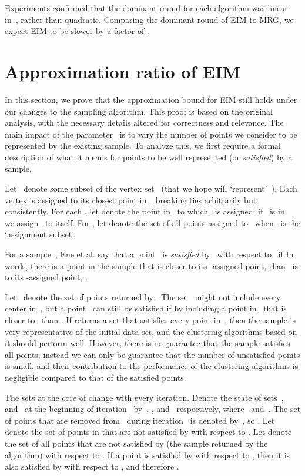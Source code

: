 \documentclass[11pt]{article}
\newcommand{\ours}{{\sc MRG}\xspace}
\newcommand{\ene}{{\sc EIM}\xspace}
\begin{document}
Experiments confirmed that
the dominant round for each algorithm was linear in~, rather
than quadratic.
Comparing the dominant round of \ene to \ours,
we expect  \ene to be slower by a factor of
. 





\section{Approximation ratio of \ene}
\label{sec:sampling}




In this section, we prove that the approximation bound for
\ene still holds under our changes to the sampling algorithm. 
This proof is based on the original analysis,
with the necessary details altered for correctness and relevance.
The main impact of the parameter~ is to vary the number of points we consider to be represented by the existing sample. 
To analyze this,
we first require a formal description of what it means for points to be well represented (or \emph{satisfied}) by a sample.


Let~ denote some subset of the vertex set~ (that we hope will
`represent'~).
Each vertex  is assigned to its closest point in~,
breaking ties arbitrarily but consistently.
For each , let  denote the point in~ to which~ is
assigned; if~ is in~ we assign~ to itself. 
For , let  denote the set of all points assigned to~
when~ is the `assignment subset'. 

For a sample~,
Ene et al. say that a point~ is \emph{satisfied} by~ with respect
to~ if 
In words, there is a point in the sample that is closer to its -assigned
point, than~ is to its -assigned point, . 



Let~ denote the set of points returned by . 
The set~ might not include every center in~, but a point~ can still be satisfied if 
by including a point in~ that is closer to~ than . 
If  returns a set 
that satisfies every point in~,
then the sample is very representative of the initial data set,
and the clustering algorithms based on it should perform well.
However, there is no guarantee that the sample satisfies all points;
instead we can only be guarantee that the number of unsatisfied points
is small, and their contribution to the performance of the clustering algorithms is negligible compared to that of the satisfied points.

The sets at the core of 
change with every iteration. 
Denote the state of  sets~,~ and~ at the beginning 
of iteration~ by~, ,
and~ respectively,
where~ and~.
The set of points that are removed from~ during iteration~ is
denoted by~, so . 
Let  denote the set of points in  that are not satisfied by  with respect to . 
Let  denote the set of all points that are not satisfied by  (the sample returned by the algorithm) with respect to . 
If a point  is satisfied by  with respect to , then it is also satisfied by  with respect to , and therefore .
\end{document}
